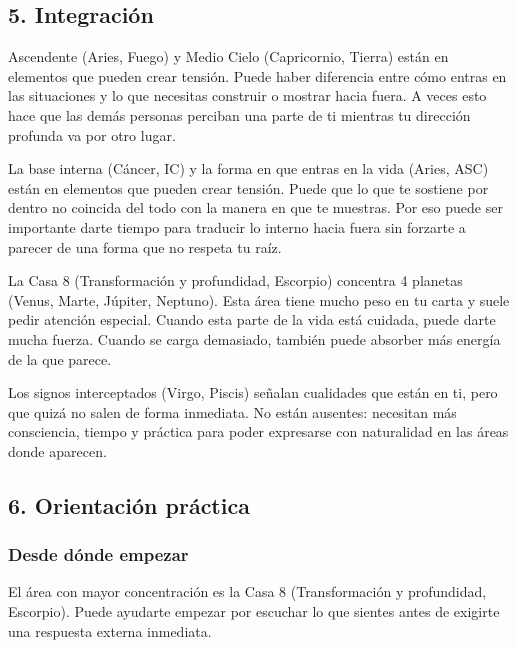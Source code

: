 \documentclass[11pt,a4paper]{article}
\begin{document}
\vspace{0.5cm}

\subsection{5. Integración}

Ascendente (Aries, Fuego) y Medio Cielo (Capricornio, Tierra) están en elementos que pueden crear tensión. Puede haber diferencia entre cómo entras en las situaciones y lo que necesitas construir o mostrar hacia fuera. A veces esto hace que las demás personas perciban una parte de ti mientras tu dirección profunda va por otro lugar.

La base interna (Cáncer, IC) y la forma en que entras en la vida (Aries, ASC) están en elementos que pueden crear tensión. Puede que lo que te sostiene por dentro no coincida del todo con la manera en que te muestras. Por eso puede ser importante darte tiempo para traducir lo interno hacia fuera sin forzarte a parecer de una forma que no respeta tu raíz.

La Casa 8 (Transformación y profundidad, Escorpio) concentra 4 planetas (Venus, Marte, Júpiter, Neptuno). Esta área tiene mucho peso en tu carta y suele pedir atención especial. Cuando esta parte de la vida está cuidada, puede darte mucha fuerza. Cuando se carga demasiado, también puede absorber más energía de la que parece.

Los signos interceptados (Virgo, Piscis) señalan cualidades que están en ti, pero que quizá no salen de forma inmediata. No están ausentes: necesitan más consciencia, tiempo y práctica para poder expresarse con naturalidad en las áreas donde aparecen.

\vspace{0.5cm}

\subsection{6. Orientación práctica}

\subsubsection*{Desde dónde empezar}
El área con mayor concentración es la Casa 8 (Transformación y profundidad, Escorpio). Puede ayudarte empezar por escuchar lo que sientes antes de exigirte una respuesta externa inmediata.
\end{document}
